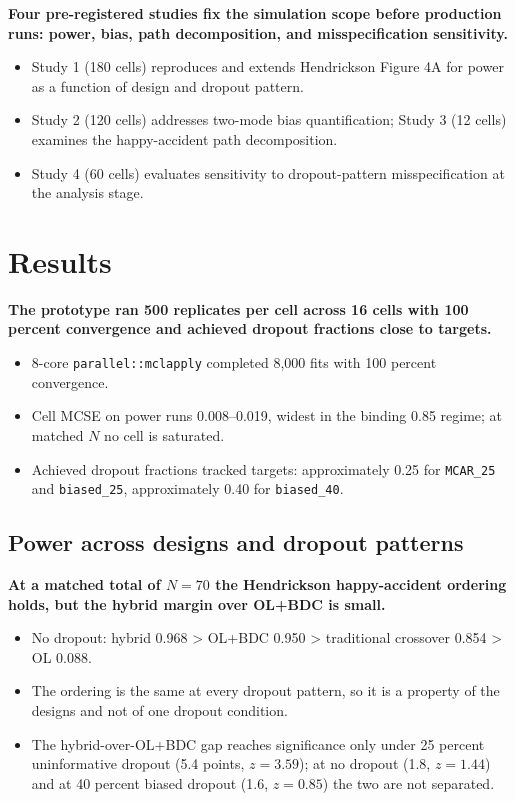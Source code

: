 \documentclass[
  11pt,
]{article}
\begin{document}
\textbf{Four pre-registered studies fix the simulation scope before production runs: power, bias, path decomposition, and misspecification sensitivity.}

\begin{itemize}\setlength{\itemsep}{2pt}\setlength{\parskip}{0pt}
\item Study 1 (180 cells) reproduces and extends Hendrickson Figure 4A for power as a function of design and dropout pattern.
\item Study 2 (120 cells) addresses two-mode bias quantification; Study 3 (12 cells) examines the happy-accident path decomposition.
\item Study 4 (60 cells) evaluates sensitivity to dropout-pattern misspecification at the analysis stage.
\end{itemize}

\section{Results}\label{results}

\textbf{The prototype ran 500 replicates per cell across 16 cells with 100 percent convergence and achieved dropout fractions close to targets.}

\begin{itemize}\setlength{\itemsep}{2pt}\setlength{\parskip}{0pt}
\item 8-core \texttt{parallel::mclapply} completed 8,000 fits with 100 percent convergence.
\item Cell MCSE on power runs 0.008--0.019, widest in the binding 0.85 regime; at matched $N$ no cell is saturated.
\item Achieved dropout fractions tracked targets: approximately 0.25 for \texttt{MCAR\_25} and \texttt{biased\_25}, approximately 0.40 for \texttt{biased\_40}.
\end{itemize}

\subsection{Power across designs and dropout patterns}\label{power-across-designs-and-dropout-patterns}

\textbf{At a matched total of $N = 70$ the Hendrickson happy-accident ordering holds, but the hybrid margin over OL+BDC is small.}

\begin{itemize}\setlength{\itemsep}{2pt}\setlength{\parskip}{0pt}
\item No dropout: hybrid 0.968 > OL+BDC 0.950 > traditional crossover 0.854 > OL 0.088.
\item The ordering is the same at every dropout pattern, so it is a property of the designs and not of one dropout condition.
\item The hybrid-over-OL+BDC gap reaches significance only under 25 percent uninformative dropout (5.4 points, $z = 3.59$); at no dropout (1.8, $z = 1.44$) and at 40 percent biased dropout (1.6, $z = 0.85$) the two are not separated.
\end{itemize}
\end{document}
